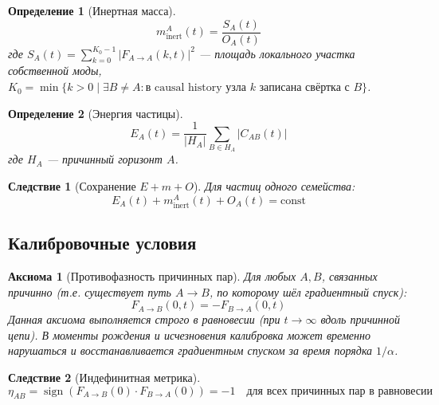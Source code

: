\documentclass[11pt,a4paper]{article}
\newtheorem{definition}{Определение}[section]
\newtheorem{axiom}{Аксиома}[section]
\newtheorem{corollary}{Следствие}[section]
\theoremstyle{definition}
\begin{document}
\begin{definition}[Инертная масса]
\begin{equation}
    m_{\text{inert}}^A(t) = \frac{S_A(t)}{O_A(t)}
\end{equation}
где $S_A(t) = \sum_{k=0}^{K_0-1} |F_{A \to A}(k, t)|^2$ --- площадь локального участка собственной моды,
$K_0 = \min\{k > 0 \mid \exists B \neq A: \text{в causal history узла } k \text{ записана свёртка с } B\}$.
\end{definition}

\begin{definition}[Энергия частицы]
\begin{equation}
    E_A(t) = \frac{1}{|H_A|} \sum_{B \in H_A} |C_{AB}(t)|
\end{equation}
где $H_A$ --- причинный горизонт $A$.
\end{definition}

\begin{corollary}[Сохранение $E + m + O$]
Для частиц одного семейства:
\begin{equation}
    E_A(t) + m_{\text{inert}}^A(t) + O_A(t) = \text{const}
\end{equation}
\end{corollary}

\subsection{Калибровочные условия}

\begin{axiom}[Противофазность причинных пар]
Для любых $A, B$, связанных причинно (т.е. существует путь $A \to B$, по которому шёл градиентный спуск):
\begin{equation}
    F_{A \to B}(0, t) = -F_{B \to A}(0, t)
\end{equation}
Данная аксиома выполняется строго в равновесии (при $t \to \infty$ вдоль причинной цепи). В моменты рождения и исчезновения калибровка может временно нарушаться и восстанавливается градиентным спуском за время порядка $1/\alpha$.
\end{axiom}

\begin{corollary}[Индефинитная метрика]
\begin{equation}
    \eta_{AB} = \operatorname{sign}(F_{A \to B}(0) \cdot F_{B \to A}(0)) = -1 \quad \text{для всех причинных пар в равновесии}
\end{equation}
\end{corollary}
\end{document}

